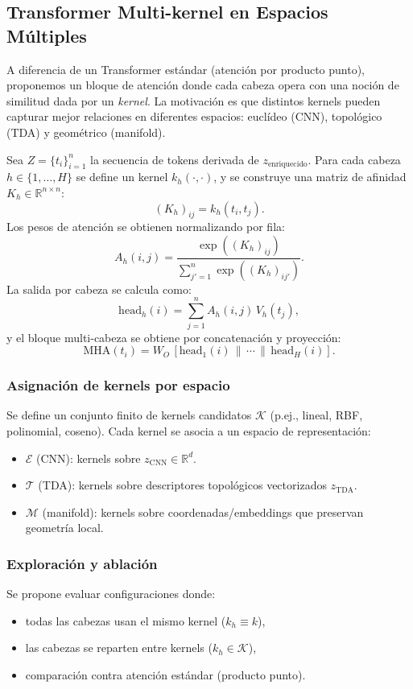 \documentclass[conference]{IEEEtran}
\begin{document}
\subsection{Transformer Multi-kernel en Espacios Múltiples}

A diferencia de un Transformer estándar (atención por producto punto), proponemos un bloque de atención donde cada cabeza opera con una noción de similitud dada por un \emph{kernel}. La motivación es que distintos kernels pueden capturar mejor relaciones en diferentes espacios: euclídeo (CNN), topológico (TDA) y geométrico (manifold).

Sea $Z = \{t_i\}_{i=1}^{n}$ la secuencia de tokens derivada de $z_{\text{enriquecido}}$. Para cada cabeza $h \in \{1,\dots,H\}$ se define un kernel $k_h(\cdot,\cdot)$, y se construye una matriz de afinidad $K_h \in \mathbb{R}^{n\times n}$:
\[
(K_h)_{ij} = k_h(t_i,t_j).
\]
Los pesos de atención se obtienen normalizando por fila:
\[
A_h(i,j) = \frac{\exp((K_h)_{ij})}{\sum_{j'=1}^{n}\exp((K_h)_{ij'})}.
\]
La salida por cabeza se calcula como:
\[
\mathrm{head}_h(i) = \sum_{j=1}^{n} A_h(i,j)\,V_h(t_j),
\]
y el bloque multi-cabeza se obtiene por concatenación y proyección:
\[
\mathrm{MHA}(t_i)=W_O\,[\mathrm{head}_1(i)\,\|\,\cdots\,\|\,\mathrm{head}_H(i)].
\]

\subsubsection{Asignación de kernels por espacio}

Se define un conjunto finito de kernels candidatos $\mathcal{K}$ (p.ej., lineal, RBF, polinomial, coseno). Cada kernel se asocia a un espacio de representación:

\begin{itemize}
    \item $\mathcal{E}$ (CNN): kernels sobre $z_{\text{CNN}} \in \mathbb{R}^{d}$.
    \item $\mathcal{T}$ (TDA): kernels sobre descriptores topológicos vectorizados $z_{\text{TDA}}$.
    \item $\mathcal{M}$ (manifold): kernels sobre coordenadas/embeddings que preservan geometría local.
\end{itemize}

\subsubsection{Exploración y ablación}

Se propone evaluar configuraciones donde:
\begin{itemize}
    \item todas las cabezas usan el mismo kernel ($k_h \equiv k$),
    \item las cabezas se reparten entre kernels ($k_h \in \mathcal{K}$),
    \item comparación contra atención estándar (producto punto).
\end{itemize}
\end{document}
